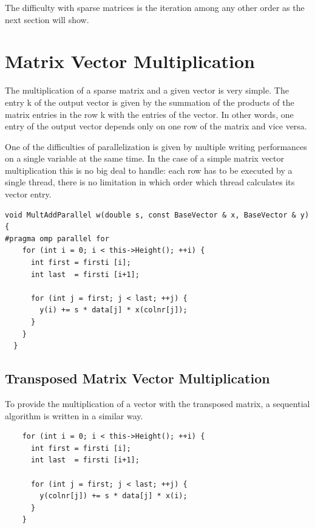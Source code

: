 \documentclass[a4paper,11pt]{scrartcl}
\begin{document}
The difficulty with sparse matrices is the iteration among any other order as
the next section will show.

\section{Matrix Vector Multiplication}
The multiplication of a sparse matrix and a given vector is very simple.
The entry k of the output vector is given by the summation of the products
of the matrix entries in the row k with the entries of the vector. In other
words, one entry of the output vector depends only on one row of the matrix
and vice versa.

One of the difficulties of parallelization is given by multiple writing
performances on a single variable at the same time. In the case of a simple
matrix vector multiplication this is no big deal to handle: each row has to be
executed by a single thread, there is no limitation in which order which thread
calculates its vector entry.

\begin{lstlisting}
void MultAddParallel w(double s, const BaseVector & x, BaseVector & y)
{
#pragma omp parallel for
    for (int i = 0; i < this->Height(); ++i) {
      int first = firsti [i];
      int last  = firsti [i+1];

      for (int j = first; j < last; ++j) {
        y(i) += s * data[j] * x(colnr[j]);
      }
    }
  }

\end{lstlisting}

\subsection{Transposed Matrix Vector Multiplication}\label{section:trans}
To provide the multiplication of a vector with the transposed matrix, a
sequential algorithm is written in a similar way.

\begin{lstlisting}
    for (int i = 0; i < this->Height(); ++i) {
      int first = firsti [i];
      int last  = firsti [i+1];

      for (int j = first; j < last; ++j) {
        y(colnr[j]) += s * data[j] * x(i);
      }
    }
\end{lstlisting}
\end{document}
